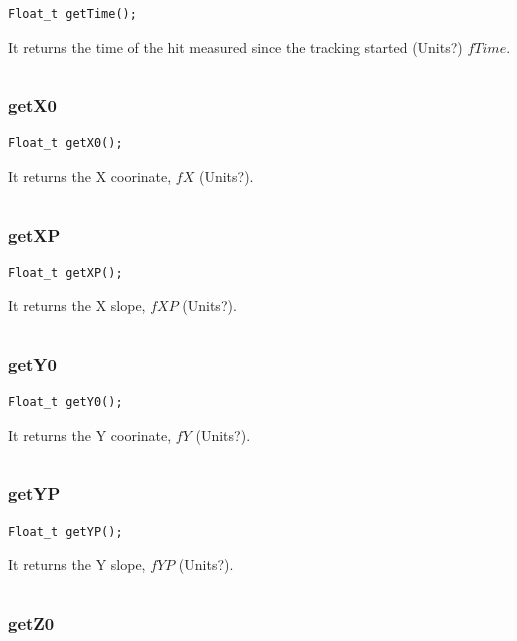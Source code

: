 \documentclass[a4paper]{book}
\begin{document}
\begin{lstlisting}[style=customc]
Float_t getTime();
\end{lstlisting}

It returns the time of the hit measured since the tracking started (Units?) $fTime$.

\[\]


\subsubsection{getX0}

\begin{lstlisting}[style=customc]
Float_t getX0();
\end{lstlisting}

It returns the X coorinate, $fX$ (Units?).

\[\]

\subsubsection{getXP}

\begin{lstlisting}[style=customc]
Float_t getXP();
\end{lstlisting}

It returns the X slope, $fXP$ (Units?).

\[\]

\subsubsection{getY0}

\begin{lstlisting}[style=customc]
Float_t getY0();
\end{lstlisting}

It returns the Y coorinate, $fY$ (Units?).

\[\]

\subsubsection{getYP}

\begin{lstlisting}[style=customc]
Float_t getYP();
\end{lstlisting}

It returns the Y slope, $fYP$ (Units?).

\[\]

\subsubsection{getZ0}
\end{document}
